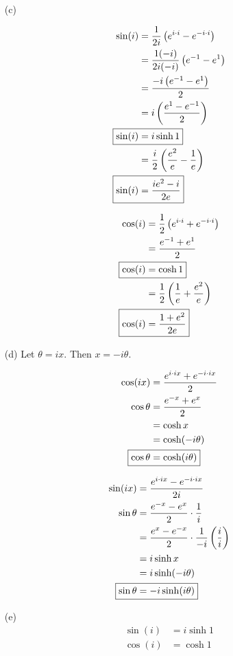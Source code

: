 \documentclass{article}
\begin{document}
\begin{itemize}
\item[(c)]
	\begin{minipage}[t]{0.5\linewidth}
		\begin{align*}
			\sin(i)&=\frac{1}{2i}\left(e^{i\cdot i}-e^{-i\cdot i}\right) \\
			&=\frac{1(-i)}{2i(-i)}\left(e^{-1}-e^1\right) \\
			&=\frac{-i\left(e^{-1}-e^1\right)}{2} \\
			&=i\left(\frac{e^1-e^{-1}}{2}\right) \\
			\Aboxed{\sin(i)&=i\sinh1} \\
			&=\frac{i}{2}\left(\frac{e^2}{e}-\frac{1}{e}\right) \\
			\Aboxed{\sin(i)&=\frac{ie^2-i}{2e}}
		\end{align*}
	\end{minipage}
	\begin{minipage}[t]{0.5\linewidth}
		\begin{align*}
			\cos(i)&=\frac{1}{2}\left(e^{i\cdot i}+e^{-i\cdot i}\right) \\
			&=\frac{e^{-1}+e^1}{2} \\
			\Aboxed{\cos(i)&=\cosh1} \\
			&=\frac{1}{2}\left(\frac{1}{e}+\frac{e^2}{e}\right) \\
			\Aboxed{\cos(i)&=\frac{1+e^2}{2e}}
		\end{align*}
	\end{minipage}

\item[(d)]
	Let $\theta=ix$. Then $x=-i\theta$.
	
	\begin{minipage}[t]{0.5\linewidth}
		\begin{align*}
			\cos(ix)&=\frac{e^{i\cdot ix}+e^{-i\cdot ix}}{2} \\
			\cos\theta&=\frac{e^{-x}+e^x}{2} \\
			&=\cosh x \\
			&=\cosh(-i\theta) \\
			\Aboxed{\cos\theta&=\cosh(i\theta)}
		\end{align*}
	\end{minipage}
	\begin{minipage}[t]{0.5\linewidth}
		\begin{align*}
			\sin(ix)&=\frac{e^{i\cdot ix}-e^{-i\cdot ix}}{2i} \\
			\sin\theta&=\frac{e^{-x}-e^x}{2}\cdot\frac{1}{i} \\
			&=\frac{e^x-e^{-x}}{2}\cdot\frac{1}{-i}\left(\frac{i}{i}\right) \\
			&=i\sinh x \\
			&=i\sinh(-i\theta) \\
			\Aboxed{\sin\theta&=-i\sinh(i\theta)}
		\end{align*}
	\end{minipage}

\item[(e)]
	\begin{align*}
		\sin(i)&=i\sinh1 \\
		\cos(i)&=\cosh1
	\end{align*}

\end{itemize}
\end{document}
